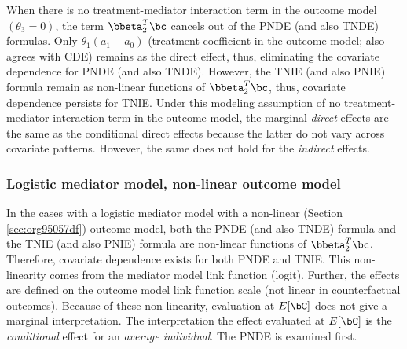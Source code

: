 \documentclass[10pt]{article}
\begin{document}
When there is no treatment-mediator interaction term in the outcome model \((\theta_{3} = 0)\), the term \(\bbeta_{2}^{T}\bc\) cancels out of the PNDE (and also TNDE) formulas. Only \(\theta_{1}(a_{1} - a_{0})\) (treatment coefficient in the outcome model; also agrees with CDE) remains as the direct effect, thus, eliminating the covariate dependence for PNDE (and also TNDE). However, the TNIE (and also PNIE) formula remain as non-linear functions of \(\bbeta_{2}^{T}\bc\), thus, covariate dependence persists for TNIE. Under this modeling assumption of no treatment-mediator interaction term in the outcome model, the marginal \emph{direct} effects are the same as the conditional direct effects because the latter do not vary across covariate patterns. However, the same does not hold for the \emph{indirect} effects.

\subsubsection{Logistic mediator model, non-linear outcome model}
\label{sec:org462d7c9}
In the cases with a logistic mediator model with a non-linear (Section \ref{sec:org95057df}) outcome model, both the PNDE (and also TNDE) formula and the TNIE (and also PNIE) formula are non-linear functions of \(\bbeta_{2}^{T}\bc\). Therefore, covariate dependence exists for both PNDE and TNIE. This non-linearity comes from the mediator model link function (logit). Further, the effects are defined on the outcome model link function scale (not linear in counterfactual outcomes). Because of these non-linearity, evaluation at \(E[\bC]\) does not give a marginal interpretation. The interpretation the effect evaluated at \(E[\bC]\) is the \emph{conditional} effect for an \emph{average individual}. The PNDE is examined first.
\end{document}
